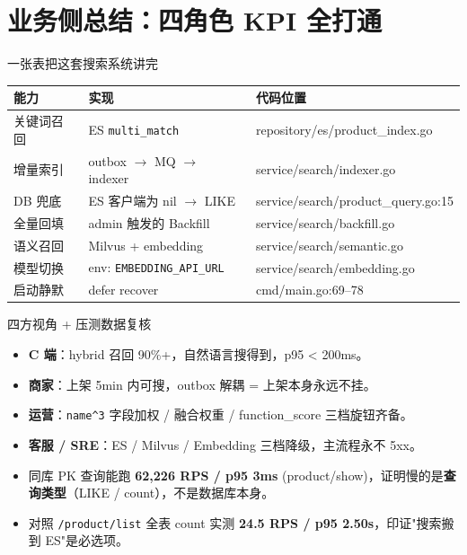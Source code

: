 \documentclass[aspectratio=169,11pt]{beamer}
\begin{document}
\section{业务侧总结：四角色 KPI 全打通}

\begin{frame}[shrink]{一张表把这套搜索系统讲完}
\begin{tabular}{@{}lll@{}}
\toprule
能力        & 实现                              & 代码位置                              \\
\midrule
关键词召回  & ES \texttt{multi\_match}           & repository/es/product\_index.go     \\
增量索引    & outbox $\to$ MQ $\to$ indexer     & service/search/indexer.go            \\
DB 兜底     & ES 客户端为 nil $\to$ LIKE        & service/search/product\_query.go:15 \\
全量回填    & admin 触发的 Backfill             & service/search/backfill.go           \\
语义召回    & Milvus + embedding                & service/search/semantic.go          \\
模型切换    & env: \texttt{EMBEDDING\_API\_URL}  & service/search/embedding.go          \\
启动静默    & defer recover                     & cmd/main.go:69--78                   \\
\bottomrule
\end{tabular}
\vspace{2mm}
\end{frame}

\begin{frame}[shrink]{四方视角 + 压测数据复核}
\begin{itemize}
  \item \textbf{C 端}：hybrid 召回 90\%+，自然语言搜得到，p95 < 200ms。
  \item \textbf{商家}：上架 5min 内可搜，outbox 解耦 = 上架本身永远不挂。
  \item \textbf{运营}：\texttt{name\^{}3} 字段加权 / 融合权重 / function\_score 三档旋钮齐备。
  \item \textbf{客服 / SRE}：ES / Milvus / Embedding 三档降级，主流程永不 5xx。
  \item 同库 PK 查询能跑 \textbf{62{,}226 RPS / p95 3ms} (product/show)，证明慢的是\textbf{查询类型}（LIKE / count），不是数据库本身。
  \item 对照 \texttt{/product/list} 全表 count 实测 \textbf{24.5 RPS / p95 2.50s}，印证"搜索搬到 ES"是必选项。
\end{itemize}
\vspace{1mm}
\end{frame}
\end{document}

